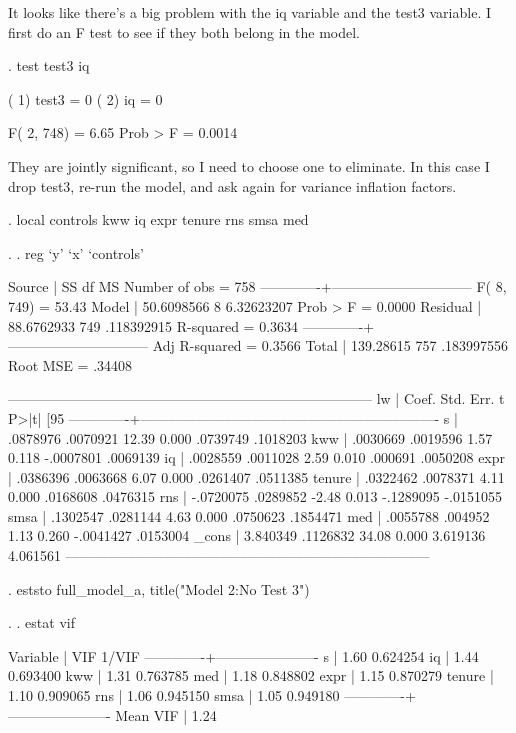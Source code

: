 \documentclass[12pt]{article}
\begin{document}
It looks like there's a big problem with the iq variable and the test3
variable. I first do an F test to see if they both belong in the
model. 

\begin{stlog}
  
. test test3 iq

 ( 1)  test3 = 0
 ( 2)  iq = 0

       F(  2,   748) =    6.65
            Prob > F =    0.0014

\end{stlog}

They are jointly significant, so I need to choose one to
eliminate. In this case I drop test3, re-run the model, and ask again
for variance inflation factors. 


\begin{stlog}
  
. local controls kww iq expr tenure rns smsa med 

. 
. reg `y' `x' `controls'

      Source |       SS       df       MS              Number of obs =     758
-------------+------------------------------           F(  8,   749) =   53.43
       Model |  50.6098566     8  6.32623207           Prob > F      =  0.0000
    Residual |  88.6762933   749  .118392915           R-squared     =  0.3634
-------------+------------------------------           Adj R-squared =  0.3566
       Total |   139.28615   757  .183997556           Root MSE      =  .34408

------------------------------------------------------------------------------
          lw |      Coef.   Std. Err.      t    P>|t|     [95%
-------------+----------------------------------------------------------------
           s |   .0878976   .0070921    12.39   0.000     .0739749    .1018203
         kww |   .0030669   .0019596     1.57   0.118    -.0007801    .0069139
          iq |   .0028559   .0011028     2.59   0.010      .000691    .0050208
        expr |   .0386396   .0063668     6.07   0.000     .0261407    .0511385
      tenure |   .0322462   .0078371     4.11   0.000     .0168608    .0476315
         rns |  -.0720075   .0289852    -2.48   0.013    -.1289095   -.0151055
        smsa |   .1302547   .0281144     4.63   0.000     .0750623    .1854471
         med |   .0055788    .004952     1.13   0.260    -.0041427    .0153004
       _cons |   3.840349   .1126832    34.08   0.000     3.619136    4.061561
------------------------------------------------------------------------------

. eststo full_model_a, title("Model 2:No Test 3")

. 
. estat vif

    Variable |       VIF       1/VIF  
-------------+----------------------
           s |      1.60    0.624254
          iq |      1.44    0.693400
         kww |      1.31    0.763785
         med |      1.18    0.848802
        expr |      1.15    0.870279
      tenure |      1.10    0.909065
         rns |      1.06    0.945150
        smsa |      1.05    0.949180
-------------+----------------------
    Mean VIF |      1.24

\end{stlog}
\end{document}
